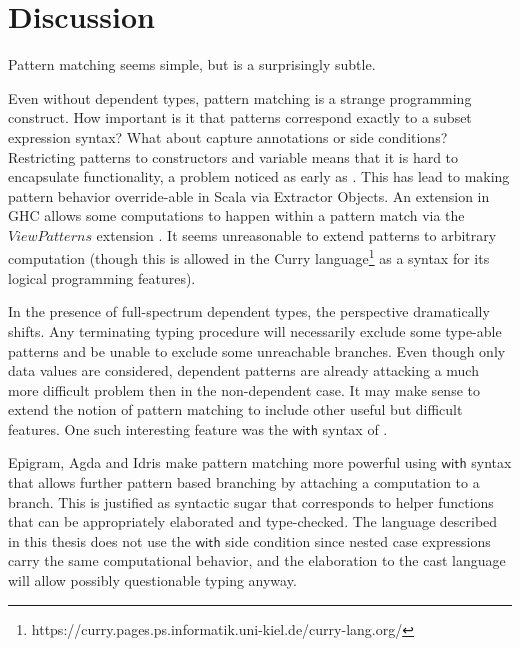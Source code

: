 \section{Discussion}



Pattern matching seems simple, but is a surprisingly subtle.

Even without dependent types, pattern matching is a strange programming
construct. How important is it that patterns correspond exactly to
a subset expression syntax? What about capture annotations or side
conditions? Restricting patterns to constructors and variable means
that it is hard to encapsulate functionality, a problem noticed as
early as\cite{10.1145/41625.41653} . This has lead
to making pattern behavior override-able in Scala via Extractor Objects.
An extension in GHC allows some computations to happen within a pattern
match via the $ViewPatterns$ extension .
It seems unreasonable to extend patterns to arbitrary computation
(though this is allowed in the Curry language\footnote{https://curry.pages.ps.informatik.uni-kiel.de/curry-lang.org/}
as a syntax for its logical programming features). 

In the presence of full-spectrum dependent types, the perspective
dramatically shifts. Any terminating typing procedure will necessarily
exclude some type-able patterns and be unable to exclude some unreachable
branches. Even though only data values are considered, dependent patterns
are already attacking a much more difficult problem then in the non-dependent
case. It may make sense to extend the notion of pattern matching to
include other useful but difficult features. One such interesting
feature was the $\mathsf{with}$ syntax of \cite{mcbride_mckinna_2004}.


Epigram, Agda and Idris make pattern matching more powerful using
$\mathsf{with}$ syntax that allows further pattern based branching
by attaching a computation to a branch. This is justified as syntactic
sugar that corresponds to helper functions that can be appropriately
elaborated and type-checked. The language described in this thesis
does not use the $\mathsf{with}$ side condition since nested case
expressions carry the same computational behavior, and the elaboration
to the cast language will allow possibly questionable typing anyway.

